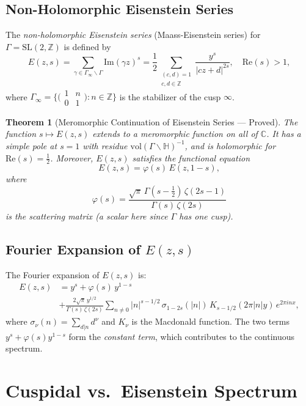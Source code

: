 \documentclass[12pt,a4paper]{amsart}
\newtheorem{theorem}{Theorem}[section]
\theoremstyle{definition}
\newcommand{\HH}{\mathbb{H}}
\newcommand{\ZZ}{\mathbb{Z}}
\newcommand{\CC}{\mathbb{C}}
\newcommand{\SL}{\mathrm{SL}}
\newcommand{\im}{\mathrm{Im}}
\newcommand{\re}{\mathrm{Re}}
\newcommand{\vol}{\mathrm{vol}}
\begin{document}
\subsection{Non-Holomorphic Eisenstein Series}

The \emph{non-holomorphic Eisenstein series} (Maass-Eisenstein series) for
$\Gamma = \SL(2,\ZZ)$ is defined by
\[
E(z, s) = \sum_{\gamma \in \Gamma_\infty \backslash \Gamma} \im(\gamma z)^s
= \frac{1}{2} \sum_{\substack{(c,d)=1 \\ c,d \in \ZZ}} \frac{y^s}{|cz+d|^{2s}},
\quad \re(s) > 1,
\]
where $\Gamma_\infty = \bigl\{ \bigl(\begin{smallmatrix}1&n\\0&1\end{smallmatrix}\bigr) : n \in \ZZ \bigr\}$
is the stabilizer of the cusp $\infty$.

\begin{theorem}[Meromorphic Continuation of Eisenstein Series — Proved]
\label{thm:eisenstein_cont}
The function $s \mapsto E(z,s)$ extends to a meromorphic function on all of $\CC$.
It has a simple pole at $s = 1$ with residue $\vol(\Gamma \backslash \HH)^{-1}$,
and is holomorphic for $\re(s) = \frac{1}{2}$.
Moreover, $E(z,s)$ satisfies the functional equation
\[
E(z, s) = \varphi(s)\, E\!\left(z, 1-s\right),
\]
where
\[
\varphi(s) = \frac{\sqrt\pi\, \Gamma(s - \tfrac{1}{2})\,\zeta(2s-1)}{\Gamma(s)\,\zeta(2s)}
\]
is the \emph{scattering matrix} (a scalar here since $\Gamma$ has one cusp).
\end{theorem}

\subsection{Fourier Expansion of $E(z,s)$}

The Fourier expansion of $E(z,s)$ is:
\begin{align*}
E(z,s) &= y^s + \varphi(s)\, y^{1-s} \\
&+ \frac{2\sqrt\pi\, y^{1/2}}{\Gamma(s)\,\zeta(2s)} \sum_{n \neq 0}
|n|^{s-1/2}\, \sigma_{1-2s}(|n|)\, K_{s-1/2}(2\pi|n|y)\, e^{2\pi i n x},
\end{align*}
where $\sigma_\nu(n) = \sum_{d|n} d^\nu$ and $K_\nu$ is the Macdonald function.
The two terms $y^s + \varphi(s) y^{1-s}$ form the \emph{constant term},
which contributes to the continuous spectrum.

\section{Cuspidal vs.\ Eisenstein Spectrum}
\label{sec:cusp_eis}
\end{document}
